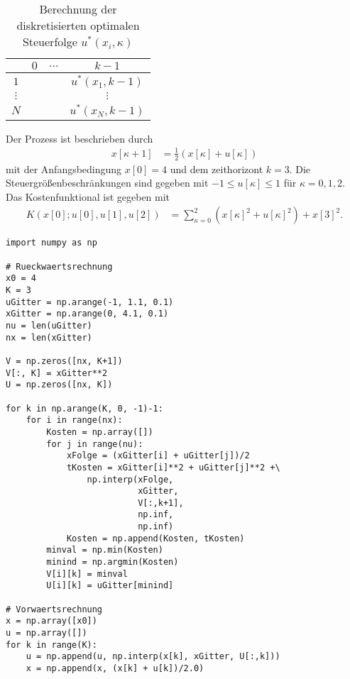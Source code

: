 \begin{table}[htb]
\caption{Berechnung der diskretisierten optimalen Steuerfolge $u^{\ast}(x_i,\kappa)$}
\centering
\begin{tabular}{|c|ccc|}
	\hline
	\diagbox{$i$}{$\kappa$} 	& $0$ 	& $\ldots$ 	& $k-1$\\\hline
	$1$							& 		& 			& $u^{\ast}(x_1,k-1)$\\
	$\vdots$					& 		& 			& $\vdots$\\
	$N$							& 		& 			& $u^{\ast}(x_N,k-1)$\\\hline
\end{tabular}
\label{tab:kap_3_dyn_prog_optu}
\end{table}
\begin{exmp}
Der Prozess ist beschrieben durch
\begin{align}
	x[\kappa + 1] & = \frac{1}{2}\left(x[\kappa]+u[\kappa] \right)
\end{align}
mit der Anfangsbedingung $x[0] = 4$ und dem zeithorizont $k=3$. Die Steuergrößenbeschränkungen sind gegeben mit $-1\leq u[\kappa]\leq 1$ für $\kappa =
0,1,2$. Das Kostenfunktional ist gegeben mit
\begin{align}
	K\left(x[0];u[0],u[1],u[2] \right) & = \sum\limits_{\kappa = 0}^2\left(x[\kappa]^2+u[\kappa]^2 \right) + x[3]^2.
\end{align}
\begin{lstlisting}[style=PythonStyle, caption=Numerische Algorithmus der \ac{DP} am \exmpref{exmp:kap_3_zeitdis_opt_2}, label=code:kap_3_sec_1_num_dp] 
import numpy as np

# Rueckwaertsrechnung
x0 = 4
K = 3
uGitter = np.arange(-1, 1.1, 0.1)
xGitter = np.arange(0, 4.1, 0.1)
nu = len(uGitter)
nx = len(xGitter)

V = np.zeros([nx, K+1])
V[:, K] = xGitter**2
U = np.zeros([nx, K])

for k in np.arange(K, 0, -1)-1:
    for i in range(nx):
        Kosten = np.array([])
        for j in range(nu):
            xFolge = (xGitter[i] + uGitter[j])/2
            tKosten = xGitter[i]**2 + uGitter[j]**2 +\
                np.interp(xFolge,
                          xGitter,
                          V[:,k+1],
                          np.inf,
                          np.inf)
            Kosten = np.append(Kosten, tKosten)
        minval = np.min(Kosten)
        minind = np.argmin(Kosten)
        V[i][k] = minval
        U[i][k] = uGitter[minind]

# Vorwaertsrechnung
x = np.array([x0])
u = np.array([])
for k in range(K):
    u = np.append(u, np.interp(x[k], xGitter, U[:,k]))
    x = np.append(x, (x[k] + u[k])/2.0)


\end{lstlisting}
\end{exmp}
